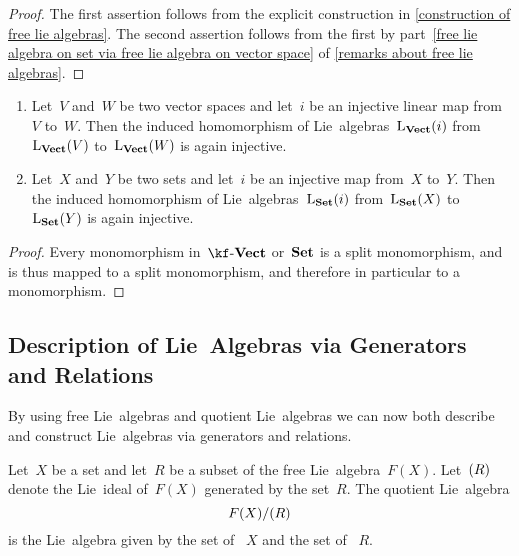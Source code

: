 \begin{proof}
	The first assertion follows from the explicit construction in \cref{construction of free lie algebras}.
	The second assertion follows from the first by part~\ref{free lie algebra on set via free lie algebra on vector space} of \cref{remarks about free lie algebras}.
\end{proof}


\begin{proposition}
	\label{subsets give free lie subalgebras}
	\leavevmode
	\begin{enumerate}
		\item
			Let~$V$ and~$W$ be two vector spaces and let~$i$ be an injective linear map from~$V$ to~$W$.
			Then the induced homomorphism of Lie~algebras~$\operatorname{L}_{\mathbf{Vect}}(i)$ from~$\operatorname{L}_{\mathbf{Vect}}(V)$ to~$\operatorname{L}_{\mathbf{Vect}}(W)$ is again injective.
		\item
			Let~$X$ and~$Y$ be two sets and let~$i$ be an injective map from~$X$ to~$Y$.
			Then the induced homomorphism of Lie~algebras~$\operatorname{L}_{\mathbf{Set}}(i)$ from~$\operatorname{L}_{\mathbf{Set}}(X)$ to~$\operatorname{L}_{\mathbf{Set}}(Y)$ is again injective.
	\end{enumerate}
\end{proposition}


\begin{proof}
	Every monomorphism in~$\cVect{\kf}$ or~$\mathbf{Set}$ is a split monomorphism, and is thus mapped to a split monomorphism, and therefore in particular to a monomorphism.
\end{proof}



\subsection{Description of Lie~Algebras via Generators and Relations}

\begin{fluff}
	By using free Lie~algebras and quotient Lie~algebras we can now both describe and construct Lie~algebras via generators and relations.
\end{fluff}


\begin{definition}
	Let~$X$ be a set and let~$R$ be a subset of the free Lie~algebra~$F(X)$.
	Let~$\lparen R \rparen$ denote the Lie~ideal of~$F(X)$ generated by the set~$R$.
	The quotient Lie~algebra
	\[
		F(X) / \lparen R \rparen
	\]
	is the Lie~algebra given by the set of ~$X$ and the set of ~$R$.
\end{definition}


